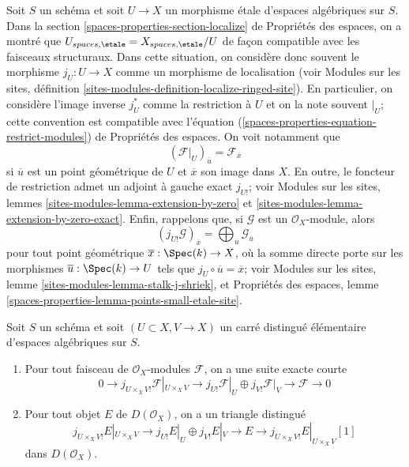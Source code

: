 \medskip\noindent
Soit $S$ un sch\'ema et soit $U \to X$ un morphisme \'etale d'espaces
alg\'ebriques sur $S$. Dans la section
\ref{spaces-properties-section-localize} de Propri\'et\'es des espaces,
on a montr\'e que
$U_{spaces, \etale} = X_{spaces, \etale}/U$
de fa\c{c}on compatible avec les faisceaux structuraux. Dans cette situation,
on consid\`ere donc souvent le morphisme $j_U : U \to X$ comme un morphisme
de localisation (voir Modules sur les sites, d\'efinition
\ref{sites-modules-definition-localize-ringed-site}).
En particulier, on consid\`ere l'image inverse $j_U^*$ comme la restriction
\`a $U$ et on la note souvent ${}|_U$; cette convention est compatible avec
l'\'equation
(\ref{spaces-properties-equation-restrict-modules})
de Propri\'et\'es des espaces. On voit notamment que
\begin{equation}
\label{equation-stalk-restriction}
(\mathcal{F}|_U)_{\overline{u}} = \mathcal{F}_{\overline{x}}
\end{equation}
si $\overline{u}$ est un point g\'eom\'etrique de $U$ et $\overline{x}$ son
image dans $X$. En outre, le foncteur de restriction admet un adjoint \`a
gauche exact $j_{U!}$; voir Modules sur les sites, lemmes
\ref{sites-modules-lemma-extension-by-zero} et
\ref{sites-modules-lemma-extension-by-zero-exact}.
Enfin, rappelons que, si $\mathcal{G}$ est un $\mathcal{O}_X$-module, alors
\begin{equation}
\label{equation-stalk-j-shriek}
(j_{U!}\mathcal{G})_{\overline{x}} =
\bigoplus\nolimits_{\overline{u}} \mathcal{G}_{\overline{u}}
\end{equation}
pour tout point g\'eom\'etrique $\overline{x} : \Spec(k) \to X$, o\`u la
somme directe porte sur les morphismes $\overline{u} : \Spec(k) \to U$
tels que $j_U \circ \overline{u} = \overline{x}$; voir Modules sur les sites,
lemme \ref{sites-modules-lemma-stalk-j-shriek}, et Propri\'et\'es des espaces,
lemme
\ref{spaces-properties-lemma-points-small-etale-site}.

\begin{lemma}
\label{lemma-exact-sequence-lower-shriek}
Soit $S$ un sch\'ema et soit $(U \subset X, V \to X)$ un carr\'e distingu\'e
\'el\'ementaire d'espaces alg\'ebriques sur $S$.
\begin{enumerate}
\item Pour tout faisceau de $\mathcal{O}_X$-modules $\mathcal{F}$, on a une
suite exacte courte
$$
0 \to j_{U \times_X V!}\mathcal{F}|_{U \times_X V} \to
j_{U!}\mathcal{F}|_U \oplus j_{V!}\mathcal{F}|_V \to \mathcal{F} \to 0
$$
\item Pour tout objet $E$ de $D(\mathcal{O}_X)$, on a un triangle distingu\'e
$$
j_{U \times_X V!}E|_{U \times_X V} \to
j_{U!}E|_U \oplus j_{V!}E|_V \to E \to 
j_{U \times_X V!}E|_{U \times_X V}[1]
$$
dans $D(\mathcal{O}_X)$.
\end{enumerate}
\end{lemma}

